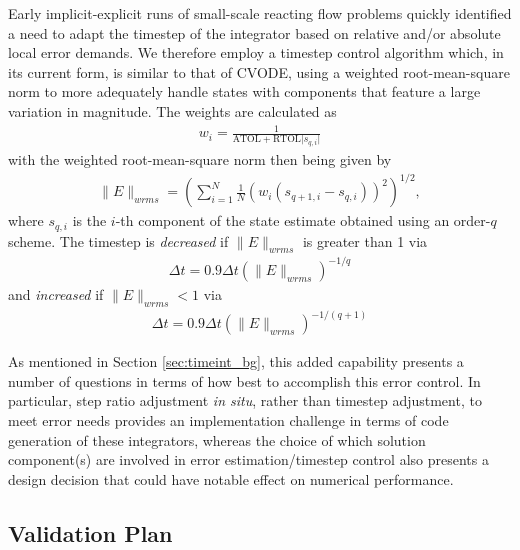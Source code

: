 Early implicit-explicit runs of small-scale reacting flow problems
quickly identified a need to adapt the timestep of the integrator based
on relative and/or absolute local error demands. We therefore employ a
timestep control algorithm which, in its current form, is similar to that of CVODE,
using a weighted root-mean-square norm to more adequately handle states with
components that feature a large variation in magnitude. The weights are calculated as
\begin{align}
w_{i} = \frac{1}{\text{ATOL} + \text{RTOL} \lvert s_{q,i} \rvert}
\end{align}
with the weighted root-mean-square norm then being given by
\begin{align}
\|E\|_{wrms} = \left(\sum_{i=1}^{N} \frac{1}{N} (w_{i}(s_{q+1,i} - s_{q,i}))^2 \right)^{1/2},
\end{align}
where $s_{q,i}$ is the $i$-th component of the state estimate obtained using an order-$q$ scheme.
The timestep is \emph{decreased} if $\|E\|_{wrms}$ is greater than 1 via
\begin{align}
\Delta t = 0.9\Delta t (\|E\|_{wrms})^{-1/q}
\end{align}
and \emph{increased} if $\|E\|_{wrms}<1$ via
\begin{align}
\Delta t = 0.9\Delta t (\|E\|_{wrms})^{-1/(q+1)}
\end{align}

As mentioned in Section \ref{sec:timeint_bg}, this added capability presents a number of
questions in terms of how best to accomplish this error control. In particular,
step ratio adjustment \emph{in situ}, rather than timestep adjustment, to meet error
needs provides an implementation challenge in terms of code generation of these
integrators, whereas the choice of which solution component(s) are involved in error
estimation/timestep control also presents a design decision that could have notable
effect on numerical performance.

\subsection{Validation Plan}

